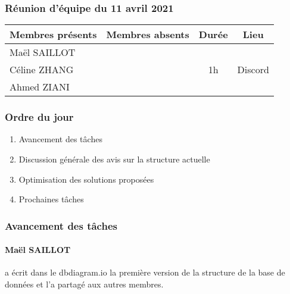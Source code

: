 


% 
\subsubsection*{\large{Réunion d'équipe du 11 avril 2021}}
\begin{center}
\begin{tabular}{| l | l || c | c |}
    \hline
    Membres présents & Membres absents & Durée & Lieu \\
    \hline
    Maël SAILLOT & & & \\ Céline ZHANG & & 1h & Discord \\ Ahmed ZIANI & & & \\
    \hline
\end{tabular}
\end{center}

\subsubsection*{Ordre du jour}
\begin{enumerate}
    \item Avancement des tâches
    \item Discussion générale des avis sur la structure actuelle
    \item Optimisation des solutions proposées
    \item Prochaines tâches
\end{enumerate}

\subsubsection*{Avancement des tâches}
\paragraph{Maël SAILLOT} a écrit dans le \textsf{dbdiagram.io} la première version de la structure de la base de données et l'a partagé aux autres membres.
